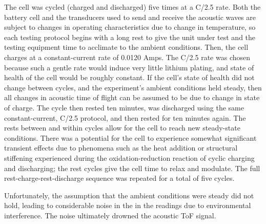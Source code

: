 The cell was cycled (charged and discharged) five times at a C/2.5 rate. 
Both the battery cell and the transducers used to send and receive the acoustic waves are subject to changes in operating characteristics due to change in temperature, so each testing protocol begins with a long rest to give the unit under test and the testing equipment time to acclimate to the ambient conditions. 
Then, the cell charges at a constant-current rate of 0.0120 Amps. 
The C/2.5 rate was chosen because such a gentle rate would induce very little lithium plating, and state of health of the cell would be roughly constant. 
If the cell's state of health did not change between cycles, and the experiment's ambient conditions held steady, then all changes in acoustic time of flight can be assumed to be due to change in state of charge.
The cycle then rested ten minutes, was discharged using the same constant-current, C/2.5 protocol, and then rested for ten minutes again. 
The rests between and within cycles allow for the cell to reach new steady-state conditions. 
There was a potential for the cell to experience somewhat significant transient effects due to phenomena such as the heat addition or structural stiffening experienced during the oxidation-reduction reaction of cyclic charging and discharging; the rest cycles give the cell time to relax and modulate.
The full rest-charge-rest-discharge sequence was repeated for a total of five cycles.


Unfortunately, the assumption that the ambient conditions were steady did not hold, leading to considerable noise in the in the readings due to environmental interference. The noise ultimately drowned the acoustic ToF signal.

    

